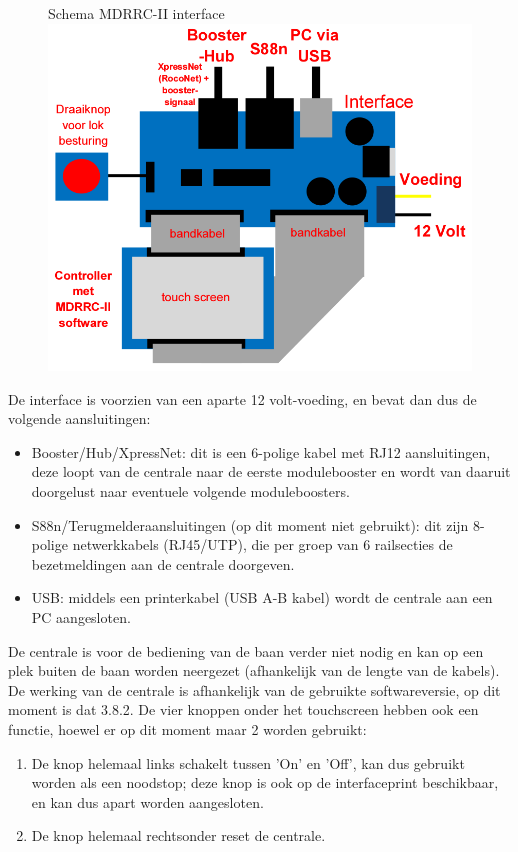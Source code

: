 \documentclass[12pt,a4paper]{report}
\begin{document}
\begin{figure}[ht]
  \captionbox
  {Schema MDRRC-II interface\label{im:interface}}
  {\includegraphics[scale=0.5]{images/rcu_schema2}\\}
\end{figure}

De interface is voorzien van een aparte 12 volt-voeding, en bevat dan dus de volgende aansluitingen:
\begin{itemize}
\item Booster/Hub/XpressNet: dit is een 6-polige kabel met RJ12 aansluitingen, deze loopt van de centrale naar de eerste modulebooster en wordt van daaruit doorgelust naar eventuele volgende moduleboosters.
\item S88n/Terugmelderaansluitingen (op dit moment niet gebruikt): dit zijn 8-polige netwerkkabels (RJ45/UTP), die per groep van 6 railsecties de bezetmeldingen aan de centrale doorgeven.
\item USB: middels een printerkabel (USB A-B kabel) wordt de centrale aan een PC aangesloten.
\end{itemize}

De centrale is voor de bediening van de baan verder niet nodig en kan op een plek buiten de baan worden neergezet (afhankelijk van de lengte van de kabels).
De werking van de centrale is afhankelijk van de gebruikte softwareversie, op dit moment is dat 3.8.2.
De vier knoppen onder het touchscreen hebben ook een functie, hoewel er op dit moment maar 2 worden gebruikt:

\begin{enumerate}
\item De knop helemaal links schakelt tussen 'On' en 'Off', kan dus gebruikt worden als een noodstop; deze knop is ook op de interfaceprint beschikbaar, en kan dus apart worden aangesloten.
\item De knop helemaal rechtsonder reset de centrale.
\end{enumerate}
\end{document}
